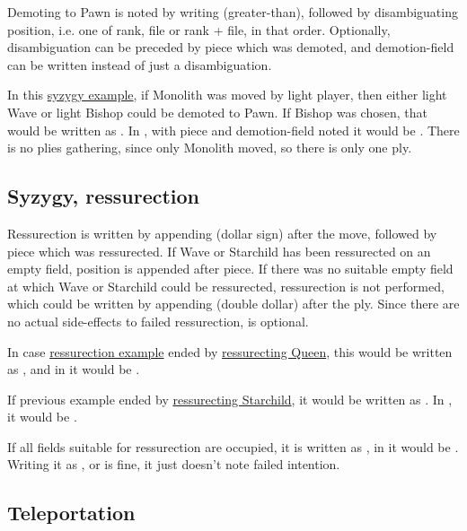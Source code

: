 Demoting to Pawn is noted by writing \alg{>} (greater-than), followed by disambiguating position, i.e.
one of rank, file or rank + file, in that order. Optionally, disambiguation can be preceded by piece which
was demoted, and demotion-field can be written instead of just a disambiguation.

In this \hyperref[fig:scn_d_15_syzygy_2_stars_init]{syzygy example}, if Monolith was moved by light player,
then either light Wave or light Bishop could be demoted to Pawn. If Bishop was chosen, that would be written
as . In , with piece and demotion-field noted it would be . There
is no plies gathering, since only Monolith moved, so there is only one ply.

\subsection*{Syzygy, ressurection}
\label{sec:Appendix/Notation/Syzygy, ressurection}

Ressurection is written by appending \alg{\$} (dollar sign) after the move, followed by piece which was
ressurected. If Wave or Starchild has been ressurected on an empty field, position is appended after piece.
If there was no suitable empty field at which Wave or Starchild could be ressurected, ressurection is not
performed, which could be written by appending \alg{\$\$} (double dollar) after the ply. Since there are
no actual side-effects to failed ressurection, \alg{\$\$} is optional.

In case \hyperref[fig:scn_o_23_syzygy_starchild_init]{ressurection example} ended by
\hyperref[fig:scn_o_24_syzygy_starchild_end]{ressurecting Queen}, this would be written as ,
and in  it would be .

If previous example ended by \hyperref[fig:scn_o_25_syzygy_starchild_ressurection]{ressurecting Starchild},
it would be written as . In , it would be .

If all fields suitable for ressurection are occupied, it is written as , in  it
would be . Writing it as , or  is fine, it just doesn't note failed
intention.

\subsection*{Teleportation}
\label{sec:Appendix/Notation/Teleportation}

